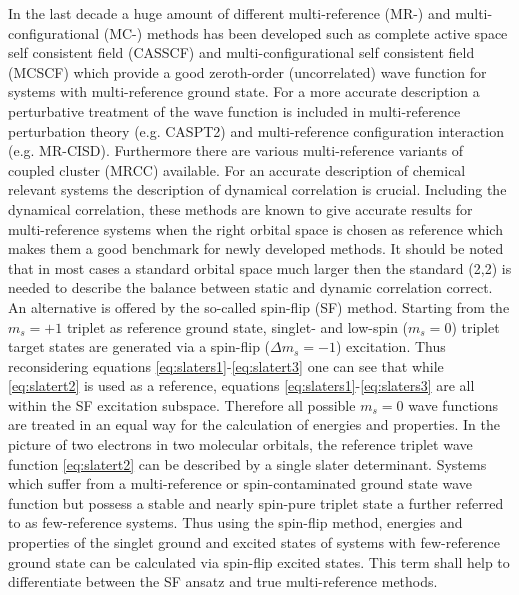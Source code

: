 \documentclass[aip,graphicx,amsmath,reprint]{revtex4-1}
\begin{document}
In the last decade a huge amount of different multi-reference (MR-) and multi-configurational (MC-) methods has been developed such as complete active space self consistent field (CASSCF)\cite{Gordon1998, Olsen2011} and multi-configurational self consistent field (MCSCF)\cite{Gordon1998} which provide a good zeroth-order (uncorrelated) wave function for systems with multi-reference ground state. For a more accurate description a perturbative treatment of the wave function is included in multi-reference perturbation theory (e.g. CASPT2)\cite{Roos2007} and multi-reference configuration interaction (e.g. MR-CISD)\cite{Knowles1988, Shepard2012}. Furthermore there are various multi-reference variants of coupled cluster (MRCC)\cite{Mukherjee1999, Schaefer2007, Schaefer2010, Gauss2008} available. For an accurate description of chemical relevant systems the description of dynamical correlation is crucial. Including the dynamical correlation, these methods are known to give accurate results for multi-reference systems when the right orbital space is chosen as reference which makes them a good benchmark for newly developed methods. It should be noted that in most cases a standard orbital space much larger then the standard (2,2) is needed to describe the balance between static and dynamic correlation correct.\cite{Krylov2002}
\\
An alternative is offered by the so-called spin-flip (SF) method. Starting from the $m_s=+1$ triplet as reference ground state, singlet- and low-spin ($m_s=0$) triplet target states are generated via a spin-flip ($\Delta m_s=-1$) excitation.\cite{Krylov2001, Krylov2006, Krylov2004, Krylov2005, Krylov2008, Krylov2001-2, Krylov2012, Sherrill2002, Head-Gordon2012, Head-Gordon2009, Krylov2003, Lefrancois2015} Thus reconsidering equations \eqref{eq:slaters1}-\eqref{eq:slatert3} one can see that while  \eqref{eq:slatert2} is used as a reference, equations \eqref{eq:slaters1}-\eqref{eq:slaters3} are all within the SF excitation subspace. Therefore all possible $m_s=0$ wave functions are treated in an equal way for the calculation of energies and properties. In the picture of two electrons in two molecular orbitals, the reference triplet wave function \eqref{eq:slatert2} can be described by a single slater determinant. Systems which suffer from a multi-reference or spin-contaminated\cite{Krylov2000} ground state wave function but possess a stable and nearly spin-pure triplet state a further referred to as few-reference systems.\cite{Lefrancois2015} Thus using the spin-flip method, energies and properties of the singlet ground and excited states of systems with few-reference ground state can be calculated via spin-flip excited states. This term shall help to differentiate between the SF ansatz and true multi-reference methods. 
\end{document}
